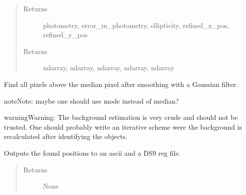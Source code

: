 \documentclass[a4paper,11pt,english]{sphinxmanual}
\begin{document}
\begin{fulllineitems}
\begin{fulllineitems}
\begin{quote}
\begin{description}
\item[{Returns}] \leavevmode
photometry, error\_in\_photometry, ellipticity, refined\_x\_pos, refined\_y\_pos

\item[{Returns}] \leavevmode
ndarray, ndarray, ndarray, ndarray, ndarray

\end{description}\end{quote}

\end{fulllineitems}


\begin{fulllineitems}
\label{analysis:analysis.sourceFinder.sourceFinder.find}
Find all pixels above the median pixel after smoothing with a Gaussian filter.

\begin{notice}{note}{Note:}
maybe one should use mode instead of median?
\end{notice}

\begin{notice}{warning}{Warning:}
The background estimation is very crude and should not be trusted. One should probably write
an iterative scheme were the background is recalculated after identifying the objects.
\end{notice}

\end{fulllineitems}


\begin{fulllineitems}
\label{analysis:analysis.sourceFinder.sourceFinder.generateOutput}
Outputs the found positions to an ascii and a DS9 reg file.
\begin{quote}\begin{description}
\item[{Returns}] \leavevmode
None

\end{description}\end{quote}

\end{fulllineitems}



\end{fulllineitems}
\end{document}
